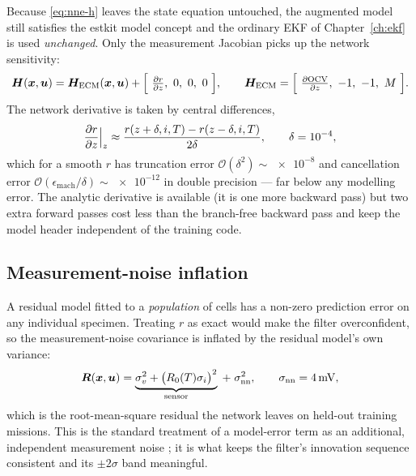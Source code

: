 Because \cref{eq:nne-h} leaves the state equation untouched, the augmented model still satisfies
the estkit model concept and the ordinary EKF of Chapter~\ref{ch:ekf} is used \emph{unchanged}.
Only the measurement Jacobian picks up the network sensitivity:
\begin{equation}\label{eq:nne-H}
\mH(\vx,\vu) = \mH_{\mathrm{ECM}}(\vx,\vu) +
\Bigl[\ \tfrac{\partial r}{\partial \soc},\ 0,\ 0,\ 0\ \Bigr],
\qquad
\mH_{\mathrm{ECM}} = \Bigl[\ \tfrac{\partial\ocv}{\partial\soc},\ -1,\ -1,\ M\ \Bigr].
\end{equation}
The network derivative is taken by central differences,
\begin{equation}\label{eq:nne-fd}
\frac{\partial r}{\partial z}\Big|_{z} \approx
\frac{r(z+\delta,i,T) - r(z-\delta,i,T)}{2\delta},\qquad \delta = \num{e-4},
\end{equation}
which for a smooth $r$ has truncation error $\mathcal{O}(\delta^2)\sim\num{e-8}$ and cancellation
error $\mathcal{O}(\epsilon_{\text{mach}}/\delta)\sim\num{e-12}$ in double precision --- far below
any modelling error.  The analytic derivative is available (it is one more backward pass) but two
extra forward passes cost less than the branch-free backward pass and keep the model header
independent of the training code.

\subsection{Measurement-noise inflation}
A residual model fitted to a \emph{population} of cells has a non-zero prediction error on any
individual specimen.  Treating $r$ as exact would make the filter overconfident, so the
measurement-noise covariance is inflated by the residual model's own variance:
\begin{equation}\label{eq:nne-R}
\bm{R}(\bm{x},\bm{u}) = \underbrace{\sigma_v^2 + \bigl(R_0(T)\sigma_i\bigr)^2}_{\text{sensor}}
\;+\; \sigma_{\mathrm{nn}}^2,
\qquad \sigma_{\mathrm{nn}} = \SI{4}{\milli\volt},
\end{equation}
which is the root-mean-square residual the network leaves on held-out training missions.  This is
the standard treatment of a model-error term as an additional, independent measurement noise
\citep{jazwinski1970}; it is what keeps the filter's innovation sequence consistent and its
$\pm2\sigma$ band meaningful.

